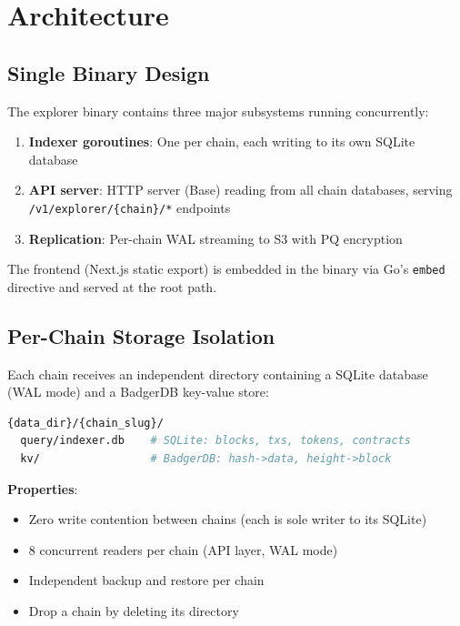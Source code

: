 \section{Architecture}


\subsection{Single Binary Design}

The explorer binary contains three major subsystems running concurrently:

\begin{enumerate}
  \item \textbf{Indexer goroutines}: One per chain, each writing to its own SQLite database
  \item \textbf{API server}: HTTP server (Base) reading from all chain databases, serving
        \texttt{/v1/explorer/\{chain\}/*} endpoints
  \item \textbf{Replication}: Per-chain WAL streaming to S3 with PQ encryption
\end{enumerate}

The frontend (Next.js static export) is embedded in the binary via Go's \texttt{embed}
directive and served at the root path.

\subsection{Per-Chain Storage Isolation}

Each chain receives an independent directory containing a SQLite database (WAL mode) and
a BadgerDB key-value store:

\begin{lstlisting}[language=bash]
{data_dir}/{chain_slug}/
  query/indexer.db    # SQLite: blocks, txs, tokens, contracts
  kv/                 # BadgerDB: hash->data, height->block
\end{lstlisting}

\textbf{Properties}:
\begin{itemize}
  \item Zero write contention between chains (each is sole writer to its SQLite)
  \item 8 concurrent readers per chain (API layer, WAL mode)
  \item Independent backup and restore per chain
  \item Drop a chain by deleting its directory
\end{itemize}

